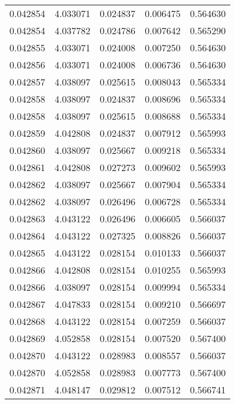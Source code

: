 \begin{tabular}{lrrrr}
0.042854    &  4.033071 &  0.024837 &  0.006475 &             0.564630 \\
0.042854    &  4.037782 &  0.024786 &  0.007642 &             0.565290 \\
0.042855    &  4.033071 &  0.024008 &  0.007250 &             0.564630 \\
0.042856    &  4.033071 &  0.024008 &  0.006736 &             0.564630 \\
0.042857    &  4.038097 &  0.025615 &  0.008043 &             0.565334 \\
0.042858    &  4.038097 &  0.024837 &  0.008696 &             0.565334 \\
0.042858    &  4.038097 &  0.025615 &  0.008688 &             0.565334 \\
0.042859    &  4.042808 &  0.024837 &  0.007912 &             0.565993 \\
0.042860    &  4.038097 &  0.025667 &  0.009218 &             0.565334 \\
0.042861    &  4.042808 &  0.027273 &  0.009602 &             0.565993 \\
0.042862    &  4.038097 &  0.025667 &  0.007904 &             0.565334 \\
0.042862    &  4.038097 &  0.026496 &  0.006728 &             0.565334 \\
0.042863    &  4.043122 &  0.026496 &  0.006605 &             0.566037 \\
0.042864    &  4.043122 &  0.027325 &  0.008826 &             0.566037 \\
0.042865    &  4.043122 &  0.028154 &  0.010133 &             0.566037 \\
0.042866    &  4.042808 &  0.028154 &  0.010255 &             0.565993 \\
0.042866    &  4.038097 &  0.028154 &  0.009994 &             0.565334 \\
0.042867    &  4.047833 &  0.028154 &  0.009210 &             0.566697 \\
0.042868    &  4.043122 &  0.028154 &  0.007259 &             0.566037 \\
0.042869    &  4.052858 &  0.028154 &  0.007520 &             0.567400 \\
0.042870    &  4.043122 &  0.028983 &  0.008557 &             0.566037 \\
0.042870    &  4.052858 &  0.028983 &  0.007773 &             0.567400 \\
0.042871    &  4.048147 &  0.029812 &  0.007512 &             0.566741 \\

\end{tabular}
